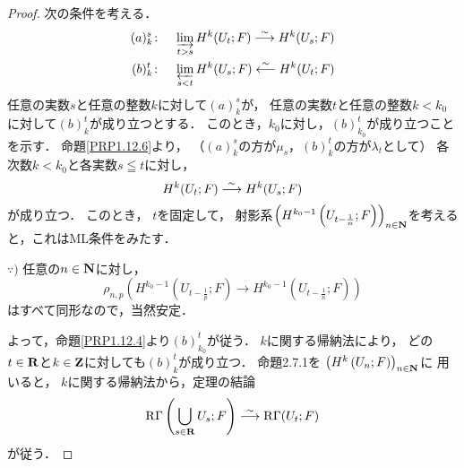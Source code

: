 \begin{proof}
    次の条件を考える．
    \begin{align*}
        (a)_k^s\colon\quad \indlim[t>s]H^k(U_t;F)\simar H^k(U_s;F)\\
        (b)_k^t\colon\quad \prolim[s<t]H^k(U_s;F)\simra H^k(U_t;F)        
    \end{align*}
    任意の実数\(s\)と任意の整数\(k\)に対して\((a)_k^s\)が，
    任意の実数\(t\)と任意の整数\(k<k_0\)に対して\((b)_k^t\)が成り立つとする．
    このとき，\(k_0\)に対し，\((b)_{k_0}^t\)が成り立つことを示す．
    命題\ref{PRP1.12.6}より，
    （\((a)_k^s\)の方が\(\mu_s\)，\((b)_k^t\)の方が\(\lambda_t\)として）
    各次数\(k<k_0\)と各実数\(s\leqq t\)に対し，
    \begin{equation}
        H^k(U_t;F)\simar H^k(U_s;F)
    \end{equation}
    が成り立つ．
    このとき，
    \(t\)を固定して，
    射影系\(\left(
        H^{k_0-1}\left(U_{t-\frac{1}{n}};F\right)
    \right)_{n\in\nn}\)を考えると，これはML条件をみたす．
    \begin{center}
        \begin{minipage}{.9\textwidth}
            \begin{redleftbar}
                \(\because)\) 
                任意の\(n\in\nn\)に対し，
                \[
                    \rho_{n,p}
                    \left(
                        H^{k_0-1}\left(U_{t-\frac{1}{p}};F\right)
                        \to 
                        H^{k_0-1}\left(U_{t-\frac{1}{n}};F\right)
                    \right)
                \]
                はすべて同形なので，当然安定．
            \end{redleftbar}
        \end{minipage}
     \end{center}        
    よって，命題\ref{PRP1.12.4}より\((b)_{k_0}^t\)が従う．
    \(k\)に関する帰納法により，
    どの\(t\in\rr\)と\(k\in\zz\)に対しても\((b)_{k}^t\)が成り立つ．
        命題2.7.1を
        \(\left(H^{k}\left(U_{n};F\right)\right)_{n\in\nn}\)に
        用いると，
    \(k\)に関する帰納法から，定理の結論
    \[
        \RG\left(\bigcup_{s\in\rr}U_s;F\right)\overset{\sim}{\longrightarrow}\RG(U_t;F)
    \]
    が従う．


\end{proof}
